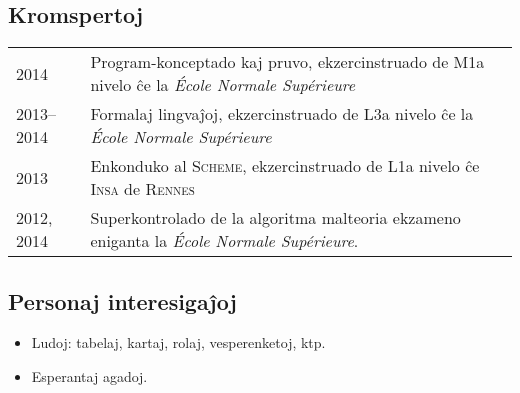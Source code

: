 \documentclass[12pt,a4paper]{article}
\makeatletter
\newcommand{\fr}[1]{\foreignlanguage{francais}{\textit{#1}}}
\newenvironment{datecvsection}[1]%
               {\subsection*{#1}%
                 \noindent \begin{tabular}{@{}p{\annee}p{\texte}@{}}}
               {\end{tabular}}
\newenvironment{itemcvsection}[1]%
               {\subsection*{#1}\begin{itemize}}
               {\end{itemize}}
\makeatother
\begin{document}
\begin{datecvsection}{Kromspertoj}

    2014 & Program-konceptado kaj pruvo, ekzercinstruado de M1a nivelo ĉe la \fr{École Normale Supérieure} \\

    2013–2014 & Formalaj lingvaĵoj, ekzercinstruado de L3a nivelo ĉe la \fr{École Normale Supérieure} \\

    2013 & Enkonduko al \textsc{Scheme}, ekzercinstruado de L1a nivelo ĉe \textsc{Insa} de \textsc{Rennes} \\

	2012, 2014 & Superkontrolado de la algoritma malteoria ekzameno eniganta la \fr{École Normale Supérieure}.

\end{datecvsection}

\begin{itemcvsection}{Personaj interesigaĵoj}

  \item Ludoj: tabelaj, kartaj, rolaj, vesperenketoj, ktp.
  \item Esperantaj agadoj.

\end{itemcvsection}
\end{document}
